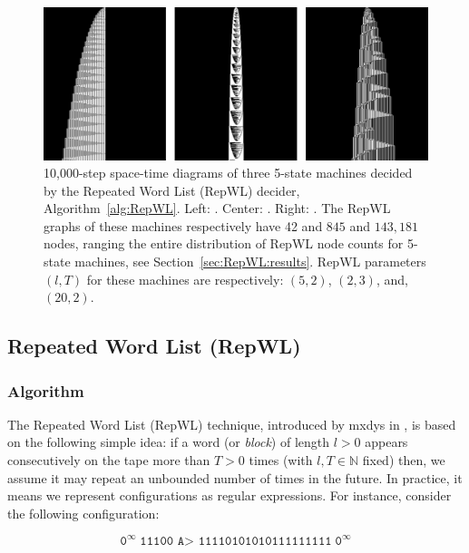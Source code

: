 \begin{figure}[h!]
    \centering
    \includegraphics[scale=0.48]{figures/RepWL/RepWL_three_machines.pdf}
    \caption{10,000-step space-time diagrams of three 5-state machines decided by the Repeated Word List (RepWL) decider, Algorithm~\ref{alg:RepWL}. Left: {\small {}}. Center: {\small {}}. Right: {\small {}}. The RepWL graphs of these machines respectively have 42 and $845$ and $143{,}181$ nodes, ranging the entire distribution of RepWL node counts for 5-state machines, see Section~\ref{sec:RepWL:results}. RepWL parameters $(l,T)$ for these machines are respectively: $(5,2)$, $(2,3)$, and, $(20,2)$.
    }\label{fig:repWLThree}
\end{figure}

\subsection{Repeated Word List (RepWL)}\label{sec:RepWL}

\subsubsection{Algorithm}

The Repeated Word List (RepWL) technique, introduced by mxdys in \CoqBB, is based on the following simple idea: if a word (or \textit{block}) of length $l > 0$ appears consecutively on the tape more than $T > 0$ times (with $l, T \in \mathbb{N}$ fixed) then, we assume it may repeat an unbounded number of times in the future. In practice, it means we represent configurations as regular expressions. For instance, consider the following configuration:

$$ \texttt{0}^\infty \; \texttt{11100 A> 11110101010111111111} \; \texttt{0}^\infty$$

